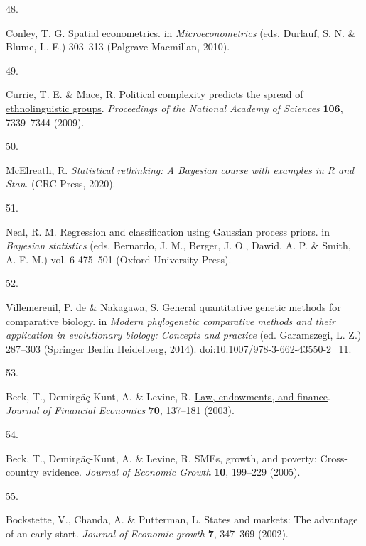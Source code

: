 \documentclass[
  man,floatsintext]{apa6}
\newlength{\cslhangindent}
\newlength{\csllabelwidth}
\newlength{\cslentryspacingunit} %
\newenvironment{CSLReferences}[2] %
 {%
  \setlength{\parindent}{0pt}
  \ifodd #1
  \let\oldpar\par
  \def\par{\hangindent=\cslhangindent\oldpar}
  \fi
  \setlength{\parskip}{#2\cslentryspacingunit}
 }%
 {}
\newcommand{\CSLLeftMargin}[1]{\parbox[t]{\csllabelwidth}{#1}}
\newcommand{\CSLRightInline}[1]{\parbox[t]{\linewidth - \csllabelwidth}{#1}\break}
\begin{document}
\begin{CSLReferences}{0}{0}
\leavevmode{}%
\CSLLeftMargin{48. }%
\CSLRightInline{Conley, T. G. Spatial econometrics. in \emph{Microeconometrics} (eds. Durlauf, S. N. \& Blume, L. E.) 303--313 (Palgrave Macmillan, 2010).}

\leavevmode{}%
\CSLLeftMargin{49. }%
\CSLRightInline{Currie, T. E. \& Mace, R. \href{https://doi.org/10.1073/pnas.0804698106}{Political complexity predicts the spread of ethnolinguistic groups}. \emph{Proceedings of the National Academy of Sciences} \textbf{106}, 7339--7344 (2009).}

\leavevmode{}%
\CSLLeftMargin{50. }%
\CSLRightInline{McElreath, R. \emph{Statistical rethinking: A {B}ayesian course with examples in {R} and {Stan}}. (CRC Press, 2020).}

\leavevmode{}%
\CSLLeftMargin{51. }%
\CSLRightInline{Neal, R. M. Regression and classification using {Gaussian} process priors. in \emph{Bayesian statistics} (eds. Bernardo, J. M., Berger, J. O., Dawid, A. P. \& Smith, A. F. M.) vol. 6 475--501 (Oxford University Press).}

\leavevmode{}%
\CSLLeftMargin{52. }%
\CSLRightInline{Villemereuil, P. de \& Nakagawa, S. General quantitative genetic methods for comparative biology. in \emph{Modern phylogenetic comparative methods and their application in evolutionary biology: Concepts and practice} (ed. Garamszegi, L. Z.) 287--303 (Springer Berlin Heidelberg, 2014). doi:\href{https://doi.org/10.1007/978-3-662-43550-2_11}{10.1007/978-3-662-43550-2\_11}.}

\leavevmode{}%
\CSLLeftMargin{53. }%
\CSLRightInline{Beck, T., Demirgäç-Kunt, A. \& Levine, R. \href{https://doi.org/10.1016/S0304-405X(03)00144-2}{Law, endowments, and finance}. \emph{Journal of Financial Economics} \textbf{70}, 137--181 (2003).}

\leavevmode{}%
\CSLLeftMargin{54. }%
\CSLRightInline{Beck, T., Demirgäç-Kunt, A. \& Levine, R. {SME}s, growth, and poverty: Cross-country evidence. \emph{Journal of Economic Growth} \textbf{10}, 199--229 (2005).}

\leavevmode{}%
\CSLLeftMargin{55. }%
\CSLRightInline{Bockstette, V., Chanda, A. \& Putterman, L. States and markets: The advantage of an early start. \emph{Journal of Economic growth} \textbf{7}, 347--369 (2002).}


\end{CSLReferences}
\end{document}
